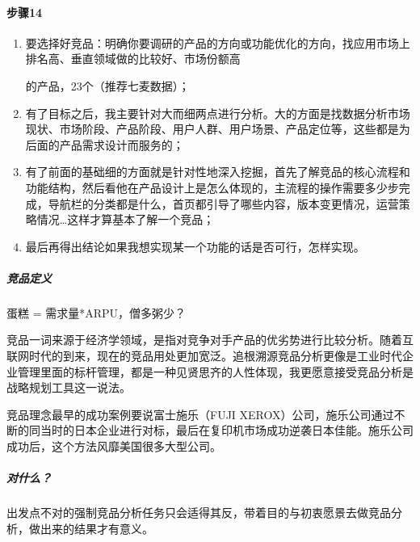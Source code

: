 \documentclass[letterpaper,10pt,english]{sphinxmanual}
\begin{document}
\paragraph{步骤14\sphinxfootnotemark[524]}
\label{\detokenize{chapter_knowledge/goods_analysis:id8}}%
\begin{footnotetext}[524]\sphinxAtStartFootnote
{}
%
\end{footnotetext}\ignorespaces \begin{enumerate}
%
\item {} 
要选择好竞品：明确你要调研的产品的方向或功能优化的方向，找应用市场上排名高、垂直领域做的比较好、市场份额高%
\begin{footnote}[525]\sphinxAtStartFootnote
{}
%
\end{footnote}的产品，2\sphinxhyphen{}3个（推荐七麦数据）；

\item {} 
有了目标之后，我主要针对大而细两点进行分析。大的方面是找数据分析市场现状、市场阶段、产品阶段、用户人群、用户场景、产品定位等，这些都是为后面的产品需求设计而服务的；

\item {} 
有了前面的基础细的方面就是针对性地深入挖掘，首先了解竞品的核心流程和功能结构，然后看他在产品设计上是怎么体现的，主流程的操作需要多少步完成，导航栏的分类都是什么，首页都引导了哪些内容，版本变更情况，运营策略情况…这样才算基本了解一个竞品；

\item {} 
最后再得出结论如果我想实现某一个功能的话是否可行，怎样实现。

\end{enumerate}


\subparagraph{竞品定义}
\label{\detokenize{chapter_knowledge/goods_analysis:id9}}
蛋糕 = 需求量*ARPU，僧多粥少？

竞品一词来源于经济学领域，是指对竞争对手产品的优劣势进行比较分析。随着互联网时代的到来，现在的竞品用处更加宽泛。追根溯源竞品分析更像是工业时代企业管理里面的标杆管理，都是一种见贤思齐的人性体现，我更愿意接受竞品分析是战略规划工具这一说法。

竞品理念最早的成功案例要说富士施乐（FUJI
XEROX）公司，施乐公司通过不断的同当时的日本企业进行对标，最后在复印机市场成功逆袭日本佳能。施乐公司成功后，这个方法风靡美国很多大型公司。


\subparagraph{对什么？}
\label{\detokenize{chapter_knowledge/goods_analysis:id10}}
出发点不对的强制竞品分析任务只会适得其反，带着目的与初衷愿景去做竞品分析，做出来的结果才有意义。
\end{document}
